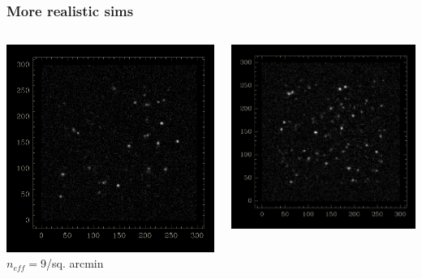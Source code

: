 \documentclass{beamer}
\begin{document}
\begin{frame}
    \frametitle{More realistic sims}
 
    \begin{columns}
        \begin{column}{0.5\textwidth}
            \begin{center}
                \includegraphics[width=\columnwidth]{10persqarcmin.png}
                \newline
                $n_{eff}=$9/sq. arcmin
            \end{center}
        \end{column}
        \begin{column}{0.5\textwidth}
            \begin{center}
                \includegraphics[width=\columnwidth]{20persqarcmin.png}

\end{center}
\end{column}
\end{columns}
\end{frame}
\end{document}
